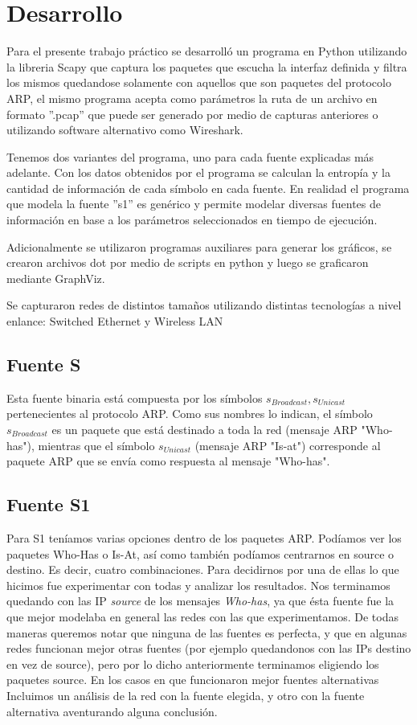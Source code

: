 \section{Desarrollo}

Para el presente trabajo práctico se desarrolló un programa en Python utilizando la libreria Scapy que captura los paquetes que escucha la interfaz definida y filtra los mismos quedandose solamente con aquellos que son paquetes del protocolo ARP, el mismo programa acepta como parámetros la ruta de un archivo en formato ''.pcap'' que puede ser generado por medio de capturas anteriores o utilizando software alternativo como Wireshark.

Tenemos dos variantes del programa, uno para cada fuente explicadas más adelante. Con los datos obtenidos por el programa se calculan la entropía y la cantidad de información de cada símbolo en cada fuente. En realidad el programa que modela la fuente ''s1'' es genérico y permite modelar diversas fuentes de información en base a los parámetros seleccionados en tiempo de ejecución.

Adicionalmente se utilizaron programas auxiliares para generar los gráficos, se crearon archivos dot por medio de scripts en python y luego se graficaron mediante GraphViz.

Se capturaron redes de distintos tamaños utilizando distintas tecnologías a nivel enlance: Switched Ethernet y Wireless LAN


\subsection{Fuente S}
Esta fuente binaria está compuesta por los símbolos ${s_{Broadcast}, s_{Unicast}}$ pertenecientes al protocolo ARP. Como sus nombres lo indican, el símbolo $s_{Broadcast}$ es un paquete que está destinado a toda la red (mensaje ARP "Who-has"), mientras que el símbolo $s_{Unicast}$ (mensaje ARP "Is-at") corresponde al paquete ARP que se envía como respuesta al mensaje "Who-has".

\subsection{Fuente S1}
Para S1 teníamos varias opciones dentro de los paquetes ARP. Podíamos ver los paquetes Who-Has o Is-At, así como también podíamos centrarnos en source o destino. Es decir, cuatro combinaciones. Para decidirnos por una de ellas lo que hicimos fue experimentar con todas y analizar los resultados. Nos terminamos quedando con las IP \textit{source} de los mensajes \textit{Who-has}, ya que ésta fuente fue la que mejor modelaba en general las redes con las que experimentamos. De todas maneras queremos notar que ninguna de las fuentes es perfecta, y que en algunas redes funcionan mejor otras fuentes (por ejemplo quedandonos con las IPs destino en vez de source), pero por lo dicho anteriormente terminamos eligiendo los paquetes source. En los casos en que funcionaron mejor fuentes alternativas Incluimos un análisis de la red con la fuente elegida, y otro con la fuente alternativa aventurando alguna conclusión.

